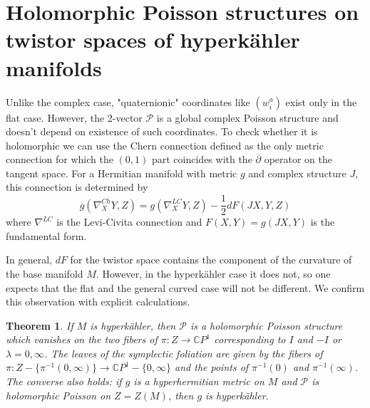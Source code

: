 \documentclass[11pt,oneside,leqno]{amsart}
\theoremstyle{plain}
\newtheorem{theorem}{Theorem}[section]
\theoremstyle{definition}
\begin{document}
\section{Holomorphic Poisson structures on twistor spaces of hyperk\"ahler manifolds}

Unlike the complex case, "quaternionic" coordinates like $(w_i^a)$ exist only in the flat case. However, the 2-vector $\mathcal{P}$ is a global complex Poisson structure and doesn't depend on existence of such coordinates. To check whether it is holomorphic we can use the Chern connection defined as the only metric connection for which the $(0,1)$ part coincides with the $\overline{\partial}$ operator on the tangent space. For a Hermitian manifold with metric $g$ and complex structure $J$, this connection is determined by $$g(\nabla^{Ch}_X Y,Z) = g(\nabla^{LC}_X Y,Z) -\frac{1}{2}dF(JX,Y,Z)$$ where $\nabla^{LC}$ is the Levi-Civita connection and $F(X,Y)=g(JX,Y)$ is the fundamental form.

In general, $dF$ for the twistor space contains the component of the curvature of the base manifold $M$. However, in the hyperk\"ahler case it does not, so one expects that the flat and the general curved case will not be different. We confirm this observation with explicit calculations.

\begin{theorem}
If $M$ is hyperk\"ahler, then $\mathcal{P}$ is a holomorphic Poisson structure which vanishes on the two fibers of $\pi:Z\rightarrow \mathbb{C}P^1$ corresponding to $I$ and $-I$ or $\lambda=0,\infty$. The leaves of the symplectic foliation are given by the fibers of $\pi:Z-\{\pi^{-1}(0,\infty)\} \rightarrow \mathbb{C}P^1- \{0,\infty\}$ and the points of $\pi^{-1}(0)$ and $\pi^{-1}(\infty)$. The converse also holds:  if $g$ is a hyperhermitian metric on $M$ and $\mathcal{P}$ is holomorphic Poisson on $Z=Z(M)$, then $g$ is hyperk\"ahler.
\end{theorem}
\end{document}
